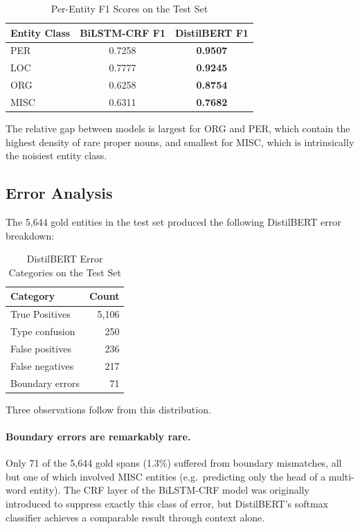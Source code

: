 \begin{table}[h]
\centering
\caption{Per-Entity F1 Scores on the Test Set}
\label{tab:q2_per_class}
\begin{tabular}{lcc}
\toprule
Entity Class & BiLSTM-CRF F1 & DistilBERT F1 \\
\midrule
\textsc{PER}  & 0.7258 & \textbf{0.9507} \\
\textsc{LOC}  & 0.7777 & \textbf{0.9245} \\
\textsc{ORG}  & 0.6258 & \textbf{0.8754} \\
\textsc{MISC} & 0.6311 & \textbf{0.7682} \\
\bottomrule
\end{tabular}
\end{table}

The relative gap between models is largest for \textsc{ORG} and
\textsc{PER}, which contain the highest density of rare proper nouns,
and smallest for \textsc{MISC}, which is intrinsically the noisiest
entity class.

\subsection{Error Analysis}

The 5{,}644 gold entities in the test set produced the following
DistilBERT error breakdown:

\begin{table}[h]
\centering
\caption{DistilBERT Error Categories on the Test Set}
\label{tab:q2_errors}
\begin{tabular}{lr}
\toprule
Category & Count \\
\midrule
True Positives  & 5{,}106 \\
Type confusion  & 250 \\
False positives & 236 \\
False negatives & 217 \\
Boundary errors & 71 \\
\bottomrule
\end{tabular}
\end{table}

Three observations follow from this distribution.

\paragraph{Boundary errors are remarkably rare.}
Only 71 of the 5{,}644 gold spans (1.3\%) suffered from boundary
mismatches, all but one of which involved \textsc{MISC} entities (e.g.\
predicting only the head of a multi-word entity). The CRF layer of the
BiLSTM-CRF model was originally introduced to suppress exactly this
class of error, but DistilBERT's softmax classifier achieves a
comparable result through context alone.

